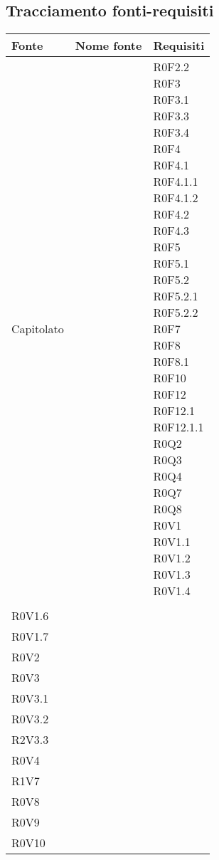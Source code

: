 \documentclass[AnalisiDeiRequisiti.tex]{subfiles}
\begin{document}
\subsection{Tracciamento fonti-requisiti}

\label{table:Tabella di tracciamento fonti-requisiti}


\renewcommand*{\arraystretch}{1.2}
\begin{longtable}[H]{p{2cm}p{5cm}p{5cm}}
	\rowcolor{CHeader} 
	\color{CHeaderText} \textbf{Fonte} & \color{CHeaderText} \textbf{Nome fonte} & \color{CHeaderText} \textbf{Requisiti} \\
	\endhead
	Capitolato & & \makecell[tl]{ R0F2.2 \\
	 R0F3 \\
	 R0F3.1 \\
	 R0F3.3 \\
	 R0F3.4 \\
	 R0F4 \\
	 R0F4.1 \\
	 R0F4.1.1 \\
	 R0F4.1.2 \\
	 R0F4.2 \\
	 R0F4.3 \\
	 R0F5 \\
	 R0F5.1 \\
	 R0F5.2 \\
	 R0F5.2.1 \\
	 R0F5.2.2 \\
	 R0F7 \\
	 R0F8 \\
	 R0F8.1 \\
	 R0F10 \\
	 R0F12\\
	 R0F12.1 \\
	 R0F12.1.1 \\
	 R0Q2 \\
	 R0Q3 \\
	 R0Q4 \\
	 R0Q7 \\
	 R0Q8 \\
	 R0V1 \\
	 R0V1.1 \\
	 R0V1.2 \\
	 R0V1.3 \\
	 R0V1.4 } \\
\rowcolor{CRigheDispari}
& & \makecell[tl]{ %
	 R0V1.5 \\
	 R0V1.6 \\
	 R0V1.7 \\
	 R0V2 \\
	 R0V3 \\
	 R0V3.1 \\
	 R0V3.2 \\
	 R2V3.3 \\
	 R0V4 \\
	 R1V7 \\
	 R0V8 \\
	 R0V9 \\
	 R0V10 } \\
	

\end{longtable}
\end{document}
